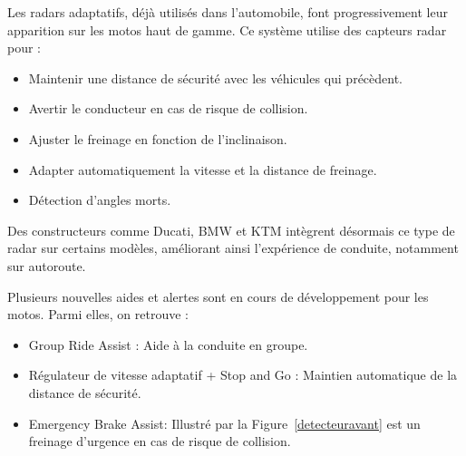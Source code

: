 Les radars adaptatifs, déjà utilisés dans l’automobile, font progressivement leur apparition sur les motos haut de gamme. Ce système utilise des capteurs radar pour :
\begin{itemize}
    \item Maintenir une distance de sécurité avec les véhicules qui précèdent.
    \item Avertir le conducteur en cas de risque de collision.
    \item Ajuster le freinage en fonction de l'inclinaison.
    \item Adapter automatiquement la vitesse et la distance de freinage.
    \item Détection d'angles morts.
\end{itemize}
Des constructeurs comme Ducati, BMW et KTM intègrent désormais ce type de radar sur certains modèles, améliorant ainsi l’expérience de conduite, notamment sur autoroute.

Plusieurs nouvelles aides et alertes sont en cours de développement pour les motos. Parmi elles, on retrouve :
\begin{itemize}
    \item Group Ride Assist : Aide à la conduite en groupe.
    \item Régulateur de vitesse adaptatif + Stop and Go : Maintien automatique de la distance de sécurité.
    \item Emergency Brake Assist: Illustré par la Figure~\ref{detecteuravant} est un freinage d’urgence en cas de risque de collision.
\end{itemize}

